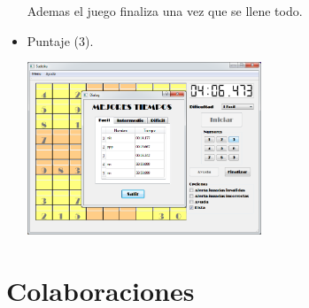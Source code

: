 \documentclass[12pt,oneside]{book}
\begin{document}
\begin{itemize}
	Ademas el juego finaliza una vez que se llene todo. 

\item   Puntaje (3).

	\includegraphics[width=0.55\textwidth]{./imagenes/puntaje.png}
\end{itemize}
\chapter{Colaboraciones}
\end{document}
